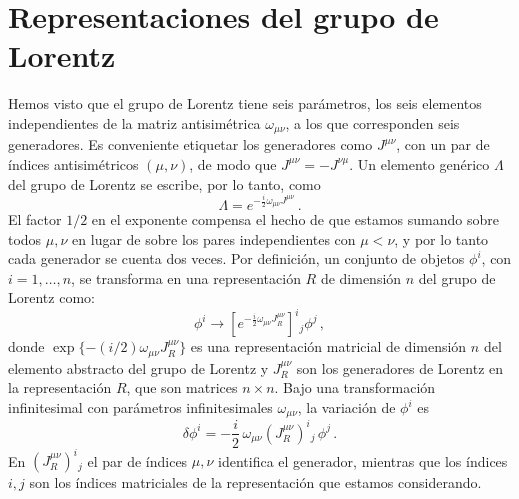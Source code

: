 \documentclass[a4paper,11pt]{book} %
\begin{document}
\section{Representaciones del grupo de Lorentz}
\noindent
Hemos visto que el grupo de Lorentz tiene seis parámetros, los seis elementos independientes de la matriz antisimétrica $\omega_{\mu\nu}$, a los que corresponden seis generadores. Es conveniente etiquetar los generadores como $J^{\mu\nu}$, con un par de índices antisimétricos $(\mu,\nu)$, de modo que $J^{\mu\nu} = -J^{\nu\mu}$. Un elemento genérico $\Lambda$ del grupo de Lorentz se escribe, por lo tanto, como
\begin{equation}
    \Lambda = e^{-\frac{i}{2}\omega_{\mu\nu}J^{\mu\nu}}\,.
\end{equation}
El factor $1/2$ en el exponente compensa el hecho de que estamos sumando sobre todos $\mu,\nu$ en lugar de sobre los pares independientes con $\mu < \nu$, y por lo tanto cada generador se cuenta dos veces.
 \medskip\newline
Por definición, un conjunto de objetos $\phi^i$, con $i = 1,\ldots,n$, se transforma en una representación $R$ de dimensión $n$ del grupo de Lorentz como:
\begin{equation}
    \phi^i \to \left[e^{-\frac{i}{2}\omega_{\mu\nu}J^{\mu\nu}_R}\right]^i{}_j \phi^j\,,
\end{equation}
donde $\exp\{-(i/2)\omega_{\mu\nu}J^{\mu\nu}_R\}$ es una representación matricial de dimensión $n$ del elemento abstracto del grupo de Lorentz y $J^{\mu\nu}_R$ son los generadores de Lorentz en la representación $R$, que son matrices $n\times n$. 
\medskip\newline
Bajo una transformación infinitesimal con parámetros infinitesimales $\omega_{\mu\nu}$, la variación de $\phi^i$ es
\begin{equation}
    \delta\phi^i = -\frac{i}{2}\,\omega_{\mu\nu}(J^{\mu\nu}_R)^i{}_j\,\phi^j\,.
\end{equation}
En $(J^{\mu\nu}_R)^i{}_j$ el par de índices $\mu,\nu$ identifica el generador, mientras que los índices $i,j$ son los índices matriciales de la representación que estamos considerando.
\end{document}
